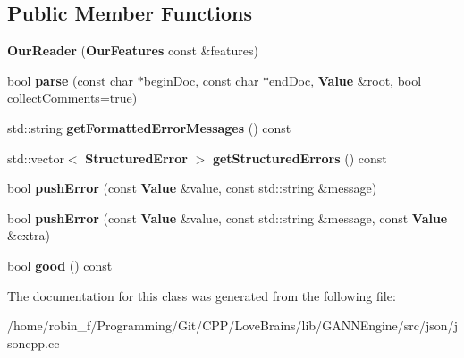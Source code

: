\subsection*{Public Member Functions}
\begin{DoxyCompactItemize}
\item 
{\bfseries Our\+Reader} ({\bf Our\+Features} const \&features)\label{class_json_1_1_our_reader_a48a850914b9c8d7781be172930c478e5}

\item 
bool {\bfseries parse} (const char $\ast$begin\+Doc, const char $\ast$end\+Doc, {\bf Value} \&root, bool collect\+Comments=true)\label{class_json_1_1_our_reader_aba4f8749aab7f02ec17f107e392caf80}

\item 
std\+::string {\bfseries get\+Formatted\+Error\+Messages} () const \label{class_json_1_1_our_reader_ae9cbb7dbd9c6c96be37432e8dfa1afcb}

\item 
std\+::vector$<$ {\bf Structured\+Error} $>$ {\bfseries get\+Structured\+Errors} () const \label{class_json_1_1_our_reader_a02ef7871af3706754a233c36e6d489e9}

\item 
bool {\bfseries push\+Error} (const {\bf Value} \&value, const std\+::string \&message)\label{class_json_1_1_our_reader_aef7aa4ca22ffaa38c401b16951d20e1e}

\item 
bool {\bfseries push\+Error} (const {\bf Value} \&value, const std\+::string \&message, const {\bf Value} \&extra)\label{class_json_1_1_our_reader_ad43315cbb0d6804e3b7177e84a1ec53d}

\item 
bool {\bfseries good} () const \label{class_json_1_1_our_reader_a048346238d703ad9aed06beb686e6102}

\end{DoxyCompactItemize}


The documentation for this class was generated from the following file\+:\begin{DoxyCompactItemize}
\item 
/home/robin\+\_\+f/\+Programming/\+Git/\+C\+P\+P/\+Love\+Brains/lib/\+G\+A\+N\+N\+Engine/src/json/jsoncpp.\+cc\end{DoxyCompactItemize}

